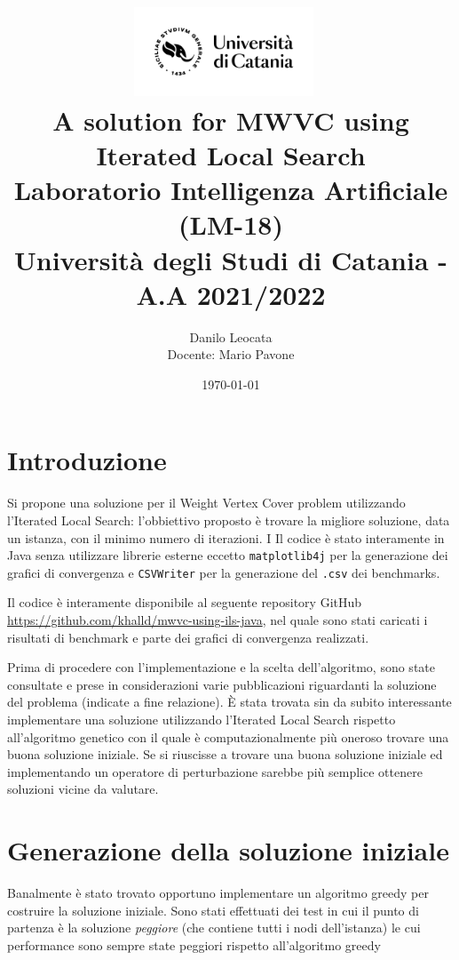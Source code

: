 \documentclass[11pt]{article}
\title{ %
\includegraphics[width=0.4\textwidth]{UniCT-Logo-Nero}~\\
A solution for MWVC using Iterated Local Search \\ 
\large Laboratorio Intelligenza Artificiale (LM-18) \\ Università degli Studi di Catania - A.A 2021/2022 \\
}
\author{ Danilo Leocata \\ Docente: Mario Pavone}
\date{\today}
\begin{document}
\maketitle	
\pagebreak



\section{Introduzione}

Si propone una soluzione per il Weight Vertex Cover problem utilizzando l'Iterated Local Search: l'obbiettivo proposto è trovare la migliore soluzione, data un istanza, con il minimo numero di iterazioni. I
Il codice è stato interamente in Java senza utilizzare librerie esterne eccetto \verb|matplotlib4j| per la generazione dei grafici di convergenza e \verb|CSVWriter| per la generazione del \verb|.csv| dei benchmarks.

Il codice è interamente disponibile al seguente repository GitHub \href{https://github.com/khalld/mwvc-using-ils-java}{https://github.com/khalld/mwvc-using-ils-java}, nel quale sono stati caricati i risultati di benchmark e parte dei grafici di convergenza realizzati.

Prima di procedere con l'implementazione e la scelta dell'algoritmo, sono state consultate e prese in considerazioni varie pubblicazioni riguardanti la soluzione del problema (indicate a fine relazione). È stata trovata sin da subito interessante implementare una soluzione utilizzando l'Iterated Local Search rispetto all'algoritmo genetico con il quale è computazionalmente più oneroso trovare una buona soluzione iniziale.
Se si riuscisse a trovare una buona soluzione iniziale ed implementando un operatore di perturbazione sarebbe più semplice ottenere soluzioni vicine da valutare.

\pagebreak

\section{Generazione della soluzione iniziale}

Banalmente è stato trovato opportuno implementare un algoritmo greedy per costruire la soluzione iniziale. Sono stati effettuati dei test in cui il punto di partenza è la soluzione \textit{peggiore} (che contiene tutti i nodi dell'istanza) le cui performance sono sempre state peggiori rispetto all'algoritmo greedy
\end{document}

